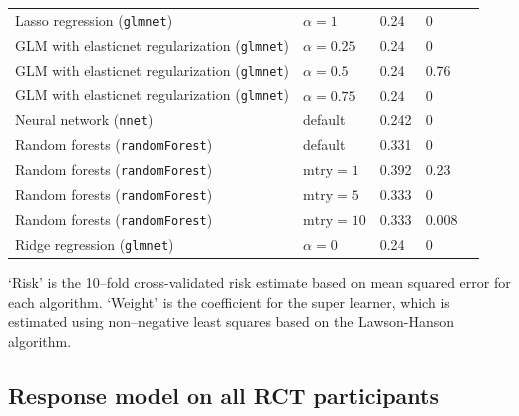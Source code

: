 \documentclass[12pt]{article}
\begin{document}
\begin{singlespace}
\begin{appendices}
\begin{table}[htb]
\begin{tabularx}{\linewidth}{l*{4}{Y}}
Lasso regression (\texttt{glmnet})  & $\alpha=1$& 0.24 & 0 \\ 
GLM with elasticnet regularization (\texttt{glmnet}) &  $\alpha=0.25$ & 0.24 & 0 \\ 
GLM with elasticnet regularization (\texttt{glmnet}) &  $\alpha=0.5$ & 0.24 & 0.76 \\ 
GLM with elasticnet regularization (\texttt{glmnet}) &  $\alpha=0.75$ & 0.24 & 0 \\ 
Neural network (\texttt{nnet}) &  default & 0.242 & 0 \\ 
Random forests (\texttt{randomForest}) & default & 0.331 & 0 \\ 
Random forests (\texttt{randomForest})  & $\mathrm{mtry}=1$ & 0.392 & 0.23 \\ 
Random forests (\texttt{randomForest})  & $\mathrm{mtry}=5$  & 0.333 & 0 \\ 
Random forests (\texttt{randomForest})  & $\mathrm{mtry}=10$ & 0.333 & 0.008 \\ 
Ridge regression (\texttt{glmnet}) &  $\alpha=0$ & 0.24 & 0 \\ 
   \hline
    \bottomrule
  \end{tabularx}
\footnotesize{`Risk' is the 10--fold cross-validated risk estimate based on mean squared error for each algorithm. `Weight' is the coefficient for the super learner, which is estimated using non--negative least squares based on the Lawson-Hanson algorithm.}
\end{table}

\pagebreak
\subsection{Response model on all RCT participants}


\end{appendices}
\end{singlespace}
\end{document}
